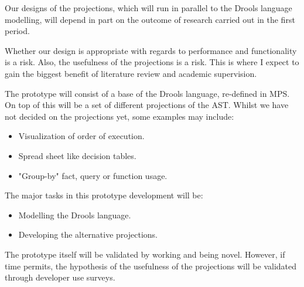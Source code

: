 Our designs of the projections, which will run in parallel to the Drools language modelling, will depend in part on the outcome of research carried out in the first period.

Whether our design is appropriate with regards to performance and functionality is a risk. 
Also, the usefulness of the projections is a risk.
This is where I expect to gain the biggest benefit of literature review and academic supervision. 

The prototype will consist of a base of the Drools language, re-defined in MPS.  
On top of this will be a set of different projections of the AST.
Whilst we have not decided on the projections yet, some examples may include:
\begin{itemize}
    \item Visualization of order of execution.
    \item Spread sheet like decision tables.
    \item "Group-by" fact, query or function usage.
\end{itemize}


The major tasks in this prototype development will be: 
\begin{itemize}
    \item Modelling the Drools language.
    \item Developing the alternative projections.
\end{itemize}

The prototype itself will be validated by working and being novel.
However, if time permits, the hypothesis of the usefulness of the projections will be validated through developer use surveys.

